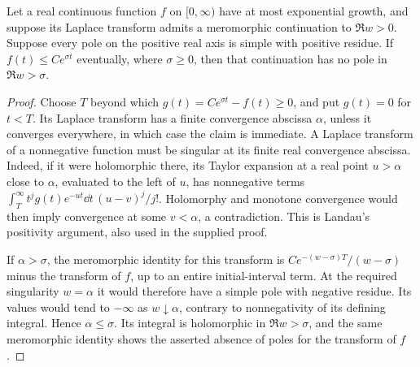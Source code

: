 \begin{lemma}\label{grid:lem:landau}
Let a real continuous function $f$ on $[0,\infty)$ have at most
exponential growth, and suppose its Laplace transform admits a
meromorphic continuation to $\Re w>0$. Suppose every pole on the
positive real axis is simple with positive residue. If
$f(t)\le C e^{\sigma t}$ eventually, where $\sigma\ge0$, then that
continuation has no pole in $\Re w>\sigma$.
\end{lemma}
\begin{proof}
Choose $T$ beyond which $g(t)=Ce^{\sigma t}-f(t)\ge0$, and put
$g(t)=0$ for $t<T$. Its Laplace transform has a finite convergence
abscissa $\alpha$, unless it converges everywhere, in which case the
claim is immediate. A Laplace transform of a nonnegative function
must be singular at its finite real convergence abscissa. Indeed,
if it were holomorphic there, its Taylor expansion at a real point
$u>\alpha$ close to $\alpha$, evaluated to the left of $u$, has
nonnegative terms
$\int_T^\infty t^j g(t)e^{-ut}\dd t\,(u-v)^j/j!$.
Holomorphy and monotone convergence would then imply convergence
at some $v<\alpha$, a contradiction. This is Landau's positivity
argument, also used in the supplied proof.

If $\alpha>\sigma$, the meromorphic identity for this transform
is $C e^{-(w-\sigma)T}/(w-\sigma)$ minus the transform of $f$,
up to an entire initial-interval term. At the required singularity
$w=\alpha$ it would therefore have a simple pole with negative
residue. Its values would tend to $-\infty$ as $w\downarrow\alpha$,
contrary to nonnegativity of its defining integral. Hence
$\alpha\le\sigma$. Its integral is holomorphic in $\Re w>\sigma$,
and the same meromorphic identity shows the asserted absence of
poles for the transform of $f$.
\end{proof}

